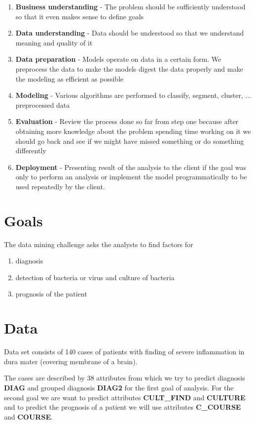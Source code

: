 \documentclass[11pt]{article}
\begin{document}
\begin{enumerate}
    \item {\bf Business understanding} - The problem should be sufficiently understood so that it even makes sense to define goals
    \item {\bf Data understanding} - Data should be understood so that we understand meaning and quality of it
    \item {\bf Data preparation} - Models operate on data in a certain form. We preprocess the data to make the models digest the data properly and make the modeling as efficient as possible
    \item {\bf Modeling} - Various algorithms are performed to classify, segment, cluster, ... preprocessed data
    \item {\bf Evaluation} - Review the process done so far from step one because after obtaining more knowledge about the problem spending time working on it we should go back and see if we might have missed something or do something differently
    \item {\bf Deployment} - Presenting result of the analysis to the client if the goal was only to perform an analysis or implement the model programmatically to be used repeatedly by the client.
\end{enumerate}

\section{Goals}
The data mining challenge asks the analysts to find factors for
\begin{enumerate}
    \item diagnosis
    \item detection of bacteria or virus and culture of bacteria
    \item prognosis of the patient
\end{enumerate}

\section{Data}
Data set consists of 140 cases of patients with finding of severe inflammation
in dura mater (covering membrane of a brain).

The cases are described by 38 attributes from which we try to predict diagnosis
{\bf DIAG} and grouped diagnosis {\bf DIAG2} for the first goal of analysis.
For the second goal we are want to predict attributes {\bf CULT\_FIND} and {\bf
CULTURE} and to predict the prognosis of a patient we will use attributes {\bf
C\_COURSE} and {\bf COURSE}.
\end{document}
